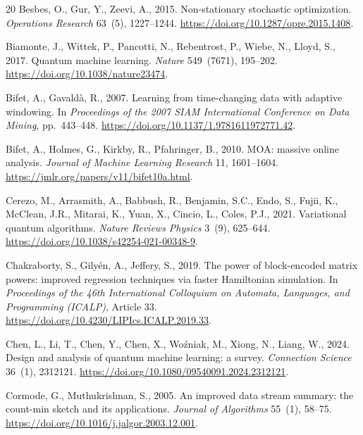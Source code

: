 \documentclass[preprint,12pt,authoryear]{elsarticle}
\begin{document}
\begin{thebibliography}{20}
Besbes, O., Gur, Y., Zeevi, A., 2015.
\newblock Non-stationary stochastic optimization.
\newblock \emph{Operations Research} 63~(5), 1227--1244.
\newblock \url{https://doi.org/10.1287/opre.2015.1408}.

Biamonte, J., Wittek, P., Pancotti, N., Rebentrost, P., Wiebe, N., Lloyd, S., 2017.
\newblock Quantum machine learning.
\newblock \emph{Nature} 549~(7671), 195--202.
\newblock \url{https://doi.org/10.1038/nature23474}.

Bifet, A., Gavald\`a, R., 2007.
\newblock Learning from time-changing data with adaptive windowing.
\newblock In \emph{Proceedings of the 2007 SIAM International Conference on Data Mining}, pp.~443--448.
\newblock \url{https://doi.org/10.1137/1.9781611972771.42}.

Bifet, A., Holmes, G., Kirkby, R., Pfahringer, B., 2010.
\newblock MOA: massive online analysis.
\newblock \emph{Journal of Machine Learning Research} 11, 1601--1604.
\newblock \url{https://jmlr.org/papers/v11/bifet10a.html}.

Cerezo, M., Arrasmith, A., Babbush, R., Benjamin, S.C., Endo, S., Fujii, K., McClean, J.R., Mitarai, K., Yuan, X., Cincio, L., Coles, P.J., 2021.
\newblock Variational quantum algorithms.
\newblock \emph{Nature Reviews Physics} 3~(9), 625--644.
\newblock \url{https://doi.org/10.1038/s42254-021-00348-9}.

Chakraborty, S., Gily\'en, A., Jeffery, S., 2019.
\newblock The power of block-encoded matrix powers: improved regression techniques via faster Hamiltonian simulation.
\newblock In \emph{Proceedings of the 46th International Colloquium on Automata, Languages, and Programming (ICALP)}, Article 33.
\newblock \url{https://doi.org/10.4230/LIPIcs.ICALP.2019.33}.

Chen, L., Li, T., Chen, Y., Chen, X., Wo\'zniak, M., Xiong, N., Liang, W., 2024.
\newblock Design and analysis of quantum machine learning: a survey.
\newblock \emph{Connection Science} 36~(1), 2312121.
\newblock \url{https://doi.org/10.1080/09540091.2024.2312121}.

Cormode, G., Muthukrishnan, S., 2005.
\newblock An improved data stream summary: the count-min sketch and its applications.
\newblock \emph{Journal of Algorithms} 55~(1), 58--75.
\newblock \url{https://doi.org/10.1016/j.jalgor.2003.12.001}.


\end{thebibliography}
\end{document}
